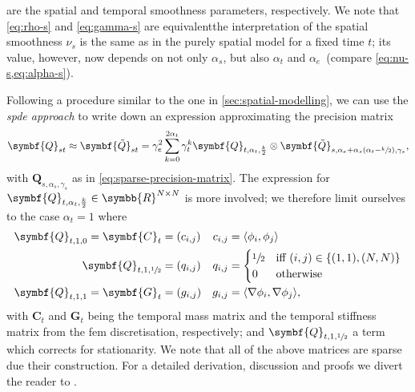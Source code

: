 \documentclass[british]{scrreprt}
\begin{document}
are the spatial and temporal smoothness parameters, respectively. We note that \cref{eq:rho-s} and \cref{eq:gamma-s} are equivalent\textemdash{}the interpretation of the spatial smoothness \( \nu_{s} \) is the same as in the purely spatial model for a fixed time \( t \); its value, however, now depends on not only \( \alpha_{s} \), but also \( \alpha_{t} \) and \( \alpha_{e} \)\ (compare \cref{eq:nu-s,eq:alpha-s}).

Following a procedure similar to the one in \cref{sec:spatial-modelling}, we can use the \textit{\gls{spde} approach} to write down an expression approximating the precision matrix
\begin{equation}
    \symbf{Q}_{st} \approx \symbf{\tilde{Q}}_{st} = \gamma_{e}^{2} \sum_{k = 0}^{2 \alpha_{t}} \gamma_{t}^{k} \symbf{Q}_{t, \alpha_{t}, \frac{k}{2}} \otimes \symbf{\tilde{Q}}_{s, \alpha_{e} + \alpha_{s} (\alpha_{t} - \sfrac{k}{2}), \gamma_{s}}
    \text{,}
    \label{eq:Q-st}
\end{equation}
with \( \symbf{Q}_{s, \alpha_{s}, \gamma_{s}} \) as in \cref{eq:sparse-precision-matrix}. The expression for \( \symbf{Q}_{t, \alpha_{t}, \frac{k}{2}} \in \symbb{R}^{N \times N} \) is more involved; we therefore limit ourselves to the case \( \alpha_{t} = 1 \) where
\begin{align}
    \symbf{Q}_{t, 1, 0} = \symbf{C}_{t} &= (c_{i, j})
        & c_{i, j} &= \langle \phi_{i}, \phi_{j} \rangle
        \label{eq:C-t} \\
    \symbf{Q}_{t, 1, \sfrac{1}{2}} &= (q_{i, j})
        & q_{i, j} &= \begin{cases}
            \sfrac{1}{2} &\text{iff } (i, j) \in \{(1, 1), (N, N)\} \\
            0 &\text{otherwise}
        \end{cases}
        \label{eq:Q-t1} \\
    \symbf{Q}_{t, 1, 1} = \symbf{G}_{t} &= (g_{i, j})
        & g_{i, j} &= \langle \nabla \phi_{i}, \nabla \phi_{j} \rangle
        \label{eq:Q-t2}
        \text{,}
\end{align}
with \( \symbf{C}_{t} \) and \( \symbf{G}_{t} \) being the temporal mass matrix and the temporal stiffness matrix from the \gls{fem} discretisation, respectively; and \( \symbf{Q}_{t, 1, \sfrac{1}{2}} \) a term which corrects for stationarity. We note that all of the above matrices are sparse due their construction. For a detailed derivation, discussion and proofs we divert the reader to \cite{BakkadiffusionbasedextensionMatern2020, Lindgrendiffusionbasedspatiotemporalextension2022}.
\end{document}
